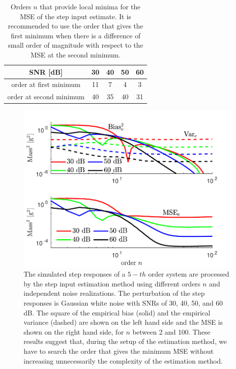 \begin{table}[!ht]
\caption{ Orders $n$ that provide local minima for the MSE of the step input estimate. It is recommended to use the order that gives the first minimum when there is a difference of small order of magnitude with respect to the MSE at the second minimum.} 
\label{Tbl:orders} 
\centering
\begin{tabular}{ |c|c c c c| } 
\hline
SNR [dB] & 30 & 40 & 50 & 60 \\
\hline
order at first minimum & 11 & 7 & 4 & 3 \\ 
order at second minimum & 40 & 35 & 40 & 31 \\
\hline
\end{tabular}
\end{table}

\begin{figure}[!htbp]
\centering
\includegraphics[width=\columnwidth]{./ChapterExperimentalValidation/fig/Fig_4.pdf} 
\caption{ \label{fig:msee_vs_n_sim} 
The simulated step responses of a $\mathrm{5-}th$ order system are processed by the step input estimation method using different orders $n$ and independent noise realizations. 
The perturbation of the step responses is Gaussian white noise with SNRs of 30, 40, 50, and 60 dB.
The square of the empirical bias (solid) and the empirical variance (dashed) are shown on the left hand side and the MSE is shown on the right hand side, for $n$ between 2 and 100.
These results suggest that, during the setup of the estimation method, we have to search the order that gives the minimum MSE without increasing unnecessarily the complexity of the estimation method.  }
\end{figure}


